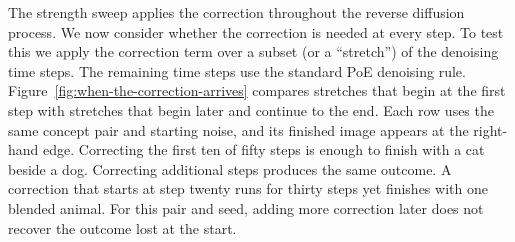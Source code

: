 \documentclass{article} %
\begin{document}

The strength sweep applies the correction throughout the reverse diffusion process. We now consider whether the correction is needed at every step. To test this we apply the correction term over a subset (or a ``stretch'') of the denoising time steps. The remaining time steps use the standard PoE denoising rule. Figure~\ref{fig:when-the-correction-arrives} compares stretches that
begin at the first step with stretches that begin later and continue
to the end. Each row uses the same concept pair and starting noise, and its finished image appears at the right-hand edge. Correcting the
first ten of fifty steps is enough to finish with a cat beside a dog.
Correcting additional steps produces the same outcome. A correction
that starts at step twenty runs for thirty steps yet finishes with one
blended animal. For this pair and seed, adding more correction later
does not recover the outcome lost at the start.
\end{document}
